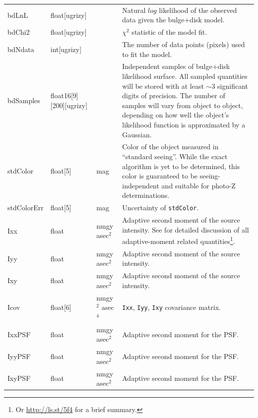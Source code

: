 \documentclass[12pt]{article}
\begin{document}
\begin{center}
\begin{longtable}{p{3cm}p{2cm}p{2cm}p{5cm}}
bdLnL & float[ugrizy] & ~ & Natural $log$ likelihood of the observed data given the bulge+disk model. \\

bdChi2 & float[ugrizy] & ~ & $\chi^2$ statistic of the model fit. \\

bdNdata & int[ugrizy] & ~ & The number of data points (pixels) used to fit the model. \\

bdSamples & float16[9][200][ugrizy] & ~ & Independent samples of bulge+disk likelihood surface. All sampled quantities will be stored with at least $\sim 3$ significant digits of precision. The number of samples will vary from object to object, depending on how well the object's likelihood function is approximated by a Gaussian.\\

stdColor & float[5] & mag & Color of the object measured in ``standard seeing''. While the exact algorithm is yet to be determined, this color is guaranteed to be seeing-independent and suitable for photo-Z determinations.\\

stdColorErr & float[5] & mag & Uncertainty of \texttt{stdColor}. \\

Ixx & float & nmgy asec$^{2}$ & Adaptive second moment of the source intensity. See \citet{2002AJ....123..583B} for detailed discussion of all adaptive-moment related quantities\footnote{Or \url{http://ls.st/5f4} for a brief summary.}. \\

Iyy & float & nmgy asec$^{2}$ & Adaptive second moment of the source intensity. \\

Ixy & float & nmgy asec$^{2}$ & Adaptive second moment of the source intensity. \\

Icov & float[6] & nmgy$^{2}$ asec$^{4}$ & \texttt{Ixx}, \texttt{Iyy}, \texttt{Ixy} covariance matrix. \\

IxxPSF & float & nmgy asec$^{2}$ & Adaptive second moment for the PSF. \\

IyyPSF & float & nmgy asec$^{2}$ & Adaptive second moment for the PSF. \\

IxyPSF & float & nmgy asec$^{2}$ & Adaptive second moment for the PSF. \\


\end{longtable}
\end{center}
\end{document}
